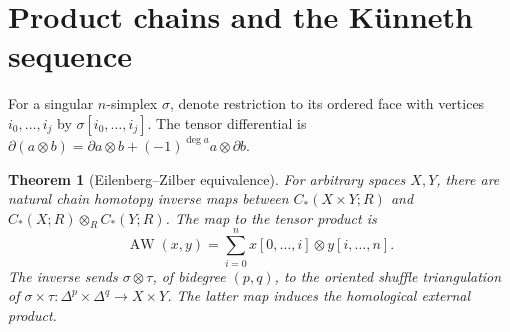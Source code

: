 \documentclass[11pt,oneside,openany]{book}
\theoremstyle{plain}
\newtheorem{theorem}{Theorem}[chapter]
\theoremstyle{definition}
\theoremstyle{remark}
\begin{document}
\section{Product chains and the K\"unneth sequence}\label{p202:T26}

For a singular \(n\)-simplex \(\sigma\), denote restriction
to its ordered face with vertices \(i_0,\ldots,i_j\) by
\(\sigma[i_0,\ldots,i_j]\). The tensor differential is
\(\partial(a\otimes b)=\partial a\otimes b+
(-1)^{\deg a}a\otimes\partial b\).

\begin{theorem}[Eilenberg--Zilber equivalence]\label{thm:p202-ez}
For arbitrary spaces \(X,Y\), there are natural chain homotopy
inverse maps between \(C_*(X\times Y;R)\) and
\(C_*(X;R)\otimes_R C_*(Y;R)\). The map to the tensor product is
\[
 \operatorname{AW}(x,y)=
 \sum_{i=0}^n x[0,\ldots,i]\otimes y[i,\ldots,n].
\]
The inverse sends \(\sigma\otimes\tau\), of bidegree \((p,q)\),
to the oriented shuffle triangulation of
\(\sigma\times\tau:\Delta^p\times\Delta^q\to X\times Y\).
The latter map induces the homological external product.
\end{theorem}
\end{document}
